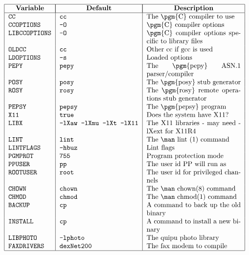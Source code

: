 \[\begin{tabular}{| l | l | p{0.4\textwidth}|}
\hline
	\multicolumn{1}{|c|}{\bf Variable} &
		\multicolumn{1}{|c|}{\bf Default} &
			\multicolumn{1}{|c|}{\bf Description} \\
\hline
	\tt CC&		\tt cc&		The \pgm{C} compiler to use\\
	\tt CCOPTIONS&	\tt -O&		\pgm{C} compiler options\\
	\tt LIBCCOPTIONS&\tt -O&	\pgm{C} compiler options specific
					to library files \\
	\tt OLDCC&	\tt cc&		Other cc if gcc is used\\
	\tt LDOPTIONS&	\tt -s&		Loaded options\\
	\tt PEPY&	\tt pepy&	The \pgm{pepy} ASN.1 parser/compiler\\
	\tt POSY&	\tt posy&	The \pgm{posy} stub generator\\
	\tt ROSY&	\tt rosy&	The \pgm{rosy} remote
					operations stub generator \\
	\tt PEPSY&	\tt pepsy&	The \pgm{pepsy} program \\
	\tt X11&	\tt true&	Does the system have X11? \\
	\tt LIBX&	\tt -lXaw -lXmu -lXt -lX11&
					The X11 libraries - may need -lXext
					for X11R4\\
	\tt LINT&	\tt lint&	The \man lint (1) command\\
	\tt LINTFLAGS&	\tt -hbuz&	Lint flags\\
	\tt PGMPROT&	\tt 755&	Program protection mode\\
	\tt PPUSER&	\tt pp&		The user id PP will run as\\
	\tt ROOTUSER&	\tt root&	The user id for privileged channels\\
	\tt CHOWN&	\tt chown&	The \man chown(8) command\\
	\tt CHMOD&	\tt chmod&	The \man chmod(1) command\\
	\tt BACKUP&	\tt cp&		A command to back up the old
binary\\
	\tt INSTALL&	\tt cp&		A command to install a new
binary\\
	\tt LIBPHOTO&	\tt -lphoto&
					The quipu photo library\\
	\tt FAXDRIVERS&	\tt dexNet200&	The fax modem to compile\\	
\hline
\end{tabular}\]

